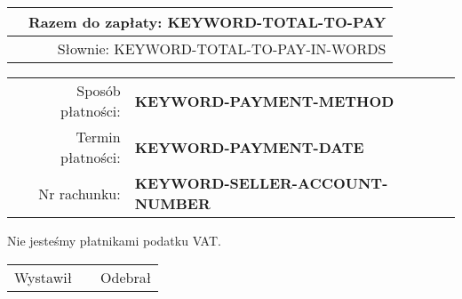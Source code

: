 \documentclass[a4paper]{book}
\begin{document}
\begin{table}[H]
\begin{tabularx}{\textwidth}{X r}
\hline
\rowcolor[HTML]{C0C0C0} 
          & \textbf{Razem do zapłaty: KEYWORD-TOTAL-TO-PAY} \\ \hline
\textbf{} & Słownie: KEYWORD-TOTAL-TO-PAY-IN-WORDS  \\ \hline
\end{tabularx}
\end{table}

\begin{table}[H]
\begin{tabularx}{0.5\textwidth}{r l}
\hspace{2cm}Sposób płatności: & \textbf{KEYWORD-PAYMENT-METHOD}           \\
Termin płatności: & \textbf{KEYWORD-PAYMENT-DATE}        \\
Nr rachunku:      & \textbf{KEYWORD-SELLER-ACCOUNT-NUMBER}
\end{tabularx}
\end{table}

 \flushleft
 Nie jesteśmy płatnikami podatku VAT.
 
 \vspace{3cm}
\begin{table}[H]
\centering
\begin{tabularx}{\textwidth}{X c X}
\cline{1-1} \cline{3-3}
\centering Wystawił & \textbf{} & \centering Odebrał
\end{tabularx}
\end{table}
\end{document}
